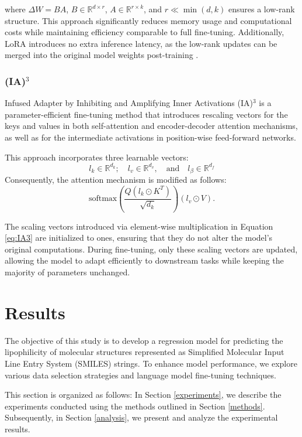 \documentclass[11pt]{article}
\begin{document}
where $\Delta W = BA$, $B \in \mathbb{R}^{d \times r}$, $A \in \mathbb{R}^{r \times k}$, and $r \ll \min(d, k)$ ensures a low-rank structure. This approach significantly reduces memory usage and computational costs while maintaining efficiency comparable to full fine-tuning. Additionally, LoRA introduces no extra inference latency, as the low-rank updates can be merged into the original model weights post-training \cite{hu2021lora}.

\subsubsection{(IA)$^3$}
    \label{iA3}
Infused Adapter by Inhibiting and Amplifying Inner Activations (IA)$^3$ \cite{liu2022fewshotparameterefficientfinetuningbetter} is a parameter-efficient fine-tuning method that introduces rescaling vectors for the keys and values in both self-attention and encoder-decoder attention mechanisms, as well as for the intermediate activations in position-wise feed-forward networks.

This approach incorporates three learnable vectors:
\[
l_k \in \mathbb{R}^{d_k}; \quad l_v \in \mathbb{R}^{d_v}, \quad \text{and} \quad l_{\beta} \in \mathbb{R}^{d_f}
\]
Consequently, the attention mechanism is modified as follows:
\begin{equation} \label{eq:IA3} \text{softmax} \left(\frac{Q  {(l_k\odot K^T)}}{\sqrt{d_k}} \right)  (l_v\odot V). \end{equation}

The scaling vectors introduced via element-wise multiplication in Equation \ref{eq:IA3} are initialized to ones, ensuring that they do not alter the model’s original computations. During fine-tuning, only these scaling vectors are updated, allowing the model to adapt efficiently to downstream tasks while keeping the majority of parameters unchanged.

\section{Results}
The objective of this study is to develop a regression model for predicting the lipophilicity of molecular structures represented as Simplified Molecular Input Line Entry System (SMILES) strings. To enhance model performance, we explore various data selection strategies and language model fine-tuning techniques.

This section is organized as follows: In Section \ref{experiments}, we describe the experiments conducted using the methods outlined in Section \ref{methods}. Subsequently, in Section \ref{analysis}, we present and analyze the experimental results.
\end{document}
